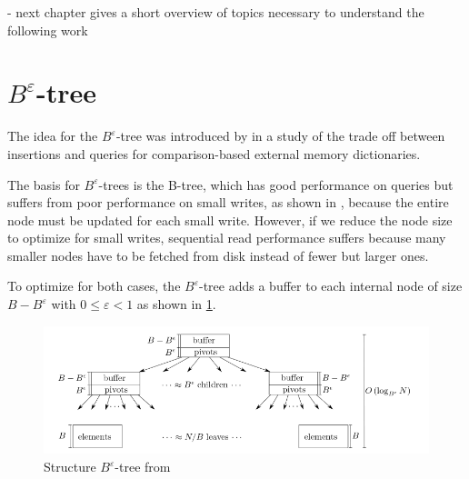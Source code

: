 \documentclass[
	12pt,
	a4paper,
	abstract,
	bibliography=totoc,
	chapterprefix,
	headings=openright,
	numbers=endperiod,
	parskip=half,
	twoside,
]{scrreprt}
\begin{document}

- next chapter gives a short overview of topics necessary to understand the following work\\

\section{$B^{\varepsilon}$-tree}
\label{sec:tree}


The idea for the $B^{\varepsilon}$-tree was introduced by \cite{brodal2003lower} in a study of the trade off between insertions and queries for comparison-based external memory dictionaries.

The basis for $B^{\varepsilon}$-trees is the B-tree, which has good performance on queries but suffers from poor performance on small writes, as shown in \cite{bender2015introduction}, 
because the entire node must be updated for each small write.
However, if we reduce the node size to optimize for small writes, sequential read performance suffers because many smaller nodes have to be fetched from disk instead of fewer but larger ones.

To optimize for both cases, the $B^{\varepsilon}$-tree adds a buffer to each internal node of size $B - B^{\varepsilon} $ with $ 0 \leq \varepsilon < 1$ as shown in \cref{fig:structure B-epsilon-tree}.

\begin{figure}[ht]
	\centering
	\includegraphics[scale=0.6]{B-epsilon_structure.png}
	\caption{Structure $B^{\varepsilon}$-tree from \cite{bender2015introduction}}
		\label{fig:structure B-epsilon-tree}
\end{figure}
\end{document}
